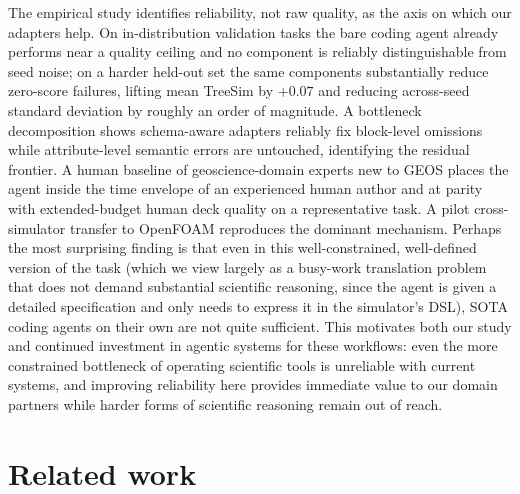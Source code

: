 \documentclass{article}
\begin{document}
The empirical study identifies reliability, not raw quality, as the axis on which our adapters help. On in-distribution validation tasks the bare coding agent already performs near a quality ceiling and no component is reliably distinguishable from seed noise; on a harder held-out set the same components substantially reduce zero-score failures, lifting mean TreeSim by $+0.07$ and reducing across-seed standard deviation by roughly an order of magnitude. A bottleneck decomposition shows schema-aware adapters reliably fix block-level omissions while attribute-level semantic errors are untouched, identifying the residual frontier. A human baseline of geoscience-domain experts new to GEOS places the agent inside the time envelope of an experienced human author and at parity with extended-budget human deck quality on a representative task. A pilot cross-simulator transfer to OpenFOAM reproduces the dominant mechanism. Perhaps the most surprising finding is that even in this well-constrained, well-defined version of the task (which we view largely as a busy-work translation problem that does not demand substantial scientific reasoning, since the agent is given a detailed specification and only needs to express it in the simulator's DSL), SOTA coding agents on their own are not quite sufficient. This motivates both our study and continued investment in agentic systems for these workflows: even the more constrained bottleneck of operating scientific tools is unreliable with current systems, and improving reliability here provides immediate value to our domain partners while harder forms of scientific reasoning remain out of reach.

\section{Related work}
\label{sec:related}
\end{document}
